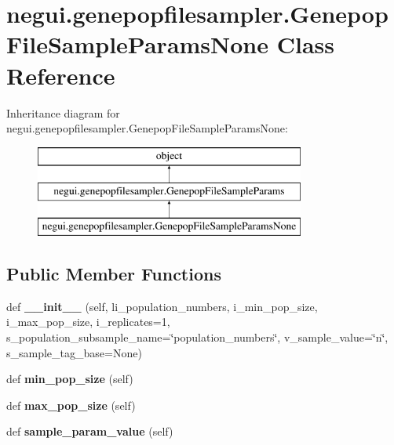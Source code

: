 \hypertarget{classnegui_1_1genepopfilesampler_1_1GenepopFileSampleParamsNone}{}\section{negui.\+genepopfilesampler.\+Genepop\+File\+Sample\+Params\+None Class Reference}
\label{classnegui_1_1genepopfilesampler_1_1GenepopFileSampleParamsNone}
Inheritance diagram for negui.\+genepopfilesampler.\+Genepop\+File\+Sample\+Params\+None\+:\begin{figure}[H]
\begin{center}
\leavevmode
\includegraphics[height=3.000000cm]{classnegui_1_1genepopfilesampler_1_1GenepopFileSampleParamsNone}
\end{center}
\end{figure}
\subsection*{Public Member Functions}
\begin{DoxyCompactItemize}
\item 
def {\bfseries \+\_\+\+\_\+init\+\_\+\+\_\+} (self, li\+\_\+population\+\_\+numbers, i\+\_\+min\+\_\+pop\+\_\+size, i\+\_\+max\+\_\+pop\+\_\+size, i\+\_\+replicates=1, s\+\_\+population\+\_\+subsample\+\_\+name=\char`\"{}population\+\_\+numbers\char`\"{}, v\+\_\+sample\+\_\+value=\char`\"{}n\char`\"{}, s\+\_\+sample\+\_\+tag\+\_\+base=None)\hypertarget{classnegui_1_1genepopfilesampler_1_1GenepopFileSampleParamsNone_a9c15bff6784a5e932e4596b7496f2ee3}{}\label{classnegui_1_1genepopfilesampler_1_1GenepopFileSampleParamsNone_a9c15bff6784a5e932e4596b7496f2ee3}

\item 
def {\bfseries min\+\_\+pop\+\_\+size} (self)\hypertarget{classnegui_1_1genepopfilesampler_1_1GenepopFileSampleParamsNone_a8410a7aa885f2155947076d344433a04}{}\label{classnegui_1_1genepopfilesampler_1_1GenepopFileSampleParamsNone_a8410a7aa885f2155947076d344433a04}

\item 
def {\bfseries max\+\_\+pop\+\_\+size} (self)\hypertarget{classnegui_1_1genepopfilesampler_1_1GenepopFileSampleParamsNone_a4c67d4b3d1124570c54b09cbe54b674a}{}\label{classnegui_1_1genepopfilesampler_1_1GenepopFileSampleParamsNone_a4c67d4b3d1124570c54b09cbe54b674a}

\item 
def {\bfseries sample\+\_\+param\+\_\+value} (self)\hypertarget{classnegui_1_1genepopfilesampler_1_1GenepopFileSampleParamsNone_add5270b7e6e3e36502cf48fe6bd3e5d0}{}\label{classnegui_1_1genepopfilesampler_1_1GenepopFileSampleParamsNone_add5270b7e6e3e36502cf48fe6bd3e5d0}

\end{DoxyCompactItemize}



